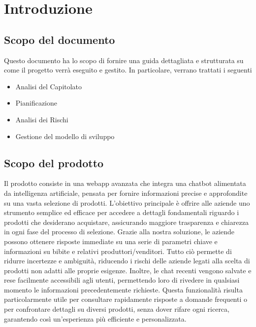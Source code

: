\documentclass{article}
\begin{document}
\newpage
\tableofcontents
\listoftables
\listoffigures



\newpage
\section{Introduzione}

    \subsection{Scopo del documento}
    Questo documento ha lo scopo di fornire una guida dettagliata e strutturata su come
    il progetto verrà eseguito e gestito. In particolare, verrano trattati i seguenti
    \begin{itemize}
        \item Analisi del Capitolato
        \item Pianificazione
        \item Analisi dei Rischi
        \item Gestione del modello di sviluppo
    \end{itemize}

    \subsection{Scopo del prodotto}
    Il prodotto consiste in una webapp avanzata che integra una chatbot alimentata da intelligenza artificiale,
    pensata per fornire informazioni precise e approfondite su una vasta selezione di prodotti. L’obiettivo principale è
    offrire alle aziende uno strumento semplice ed efficace per accedere a dettagli fondamentali riguardo i prodotti che
    desiderano acquistare, assicurando maggiore trasparenza e chiarezza in ogni fase del processo di selezione. Grazie alla
    nostra soluzione, le aziende possono ottenere risposte immediate su una serie di parametri chiave e informazioni su bibite e relativi produttori/venditori.
    Tutto ciò permette di ridurre incertezze e ambiguità, riducendo i rischi delle aziende legati alla scelta di prodotti non adatti alle proprie esigenze.
    Inoltre, le chat recenti vengono salvate e rese facilmente accessibili agli utenti, permettendo loro di rivedere in qualsiasi
    momento le informazioni precedentemente richieste. Questa funzionalità risulta particolarmente utile per consultare rapidamente
    risposte a domande frequenti o per confrontare dettagli su diversi prodotti, senza dover rifare ogni ricerca, garantendo così
    un'esperienza più efficiente e personalizzata.
\end{document}
